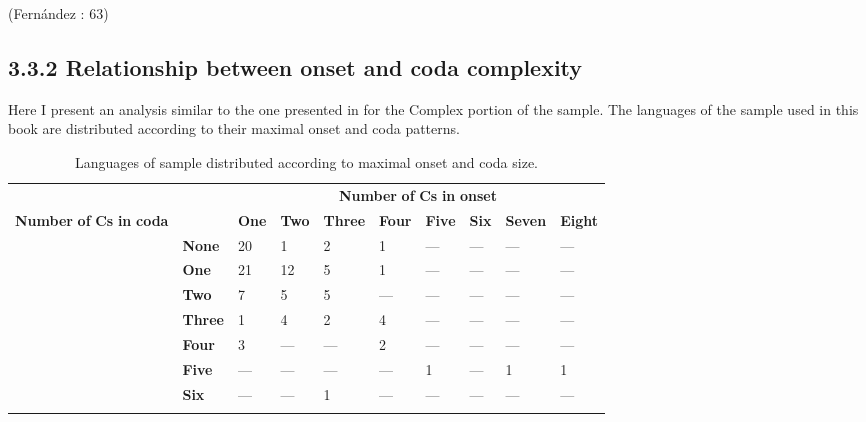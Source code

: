 (Fernández \citealt{GarayHernández2006}: 63)

\z

\subsection{3.3.2 Relationship between onset and coda complexity} 

  Here I present an analysis similar to the one presented in  for the Complex portion of the \citet{Maddieson2013a} sample. The languages of the sample used in this book are distributed according to their maximal onset and coda patterns.






\begin{table}
\begin{tabularx}{\textwidth}{XXXXXXXXXX}
\lsptoprule

{} &  & \multicolumn{8}{c}{ \textbf{Number} \textbf{of} \textbf{Cs} \textbf{in} \textbf{onset}}\\
{ \textbf{Number} \textbf{of} \textbf{Cs} \textbf{in} \textbf{coda}} &  & \textbf{One} & \textbf{Two} & \textbf{Three} & \textbf{Four} & \textbf{Five} & \textbf{Six} & \textbf{Seven} & \textbf{Eight}\\
& \textbf{None} & 20 & 1 & 2 & 1 & — & — & — & —\\
\hhline{~---------} & \textbf{One} & 21 & 12 & 5 & 1 & — & — & — & —\\
\hhline{~---------} & \textbf{Two} & 7 & 5 & 5 & — & — & — & — & —\\
\hhline{~---------} & \textbf{Three} & 1 & 4 & 2 & 4 & — & — & — & —\\
\hhline{~---------} & \textbf{Four} & 3 & — & — & 2 & — & — & — & —\\
\hhline{~---------} & \textbf{Five} & — & — & — & — & 1 & — & 1 & 1\\
\hhline{~---------} & \textbf{Six} & — & — & 1 & — & — & — & — & —\\
\hhline{~---------}
\lspbottomrule
\end{tabularx}
\caption{\label{3.2}Languages of sample distributed according to maximal onset and coda size.}
\end{table}




